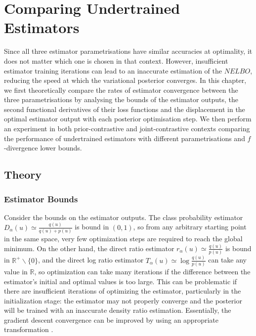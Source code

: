 \documentclass[honours,12pt]{unswthesis}
\newcommand{\R}{\mathbb{R}}
\numberwithin{equation}{section}
\theoremstyle{definition}
\begin{document}
\chapter{Comparing Undertrained Estimators}\label{ch7}
Since all three estimator parametrisations have similar accuracies at optimality, it does not matter which one is chosen in that context. However, insufficient estimator training iterations can lead to an inaccurate estimation of the $NELBO$, reducing the speed at which the variational posterior converges. In this chapter, we first theoretically compare the rates of estimator convergence between the three parametrisations by analysing the bounds of the estimator outputs, the second functional derivatives of their loss functions and the displacement in the optimal estimator output with each posterior optimisation step. We then perform an experiment in both prior-contrastive and joint-contrastive contexts comparing the performance of undertrained estimators with different parametrisations and $f$-divergence lower bounds.
\section{Theory}\label{sec:7.1}
\subsection{Estimator Bounds}
Consider the bounds on the estimator outputs. The class probability estimator $D_\alpha(u)\simeq \frac{q(u)}{q(u)+p(u)}$ is bound in $(0,1)$, so from any arbitrary starting point in the same space, very few optimization steps are required to reach the global minimum. On the other hand, the direct ratio estimator $r_\alpha(u)\simeq \frac{q(u)}{p(u)}$ is bound in $\R^+ \backslash \{0\}$, and the direct log ratio estimator $T_\alpha(u) \simeq \log \frac{q(u)}{p(u)}$ can take any value in $\R$, so optimization can take many iterations if the difference between the estimator's initial and optimal values is too large. This can be problematic if there are insufficient iterations of optimizing the estimator, particularly in the initialization stage: the estimator may not properly converge and the posterior will be trained with an inaccurate density ratio estimation. Essentially, the gradient descent convergence can be improved by using an appropriate transformation \citep{lecun}.
\end{document}
